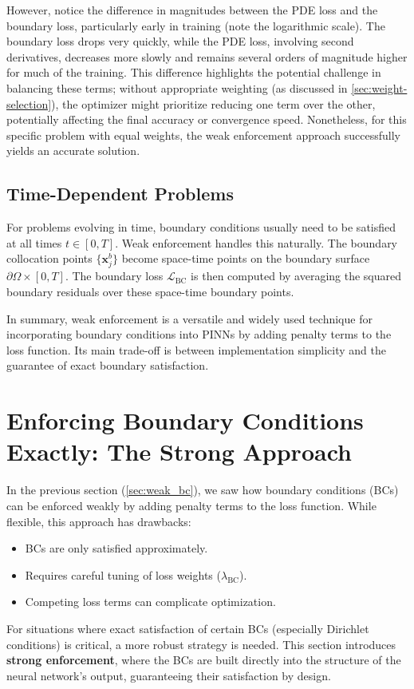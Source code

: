 However, notice the difference in magnitudes between the PDE loss and the boundary loss, particularly early in training (note the logarithmic scale). The boundary loss drops very quickly, while the PDE loss, involving second derivatives, decreases more slowly and remains several orders of magnitude higher for much of the training. This difference highlights the potential challenge in balancing these terms; without appropriate weighting (as discussed in \cref{sec:weight-selection}), the optimizer might prioritize reducing one term over the other, potentially affecting the final accuracy or convergence speed. Nonetheless, for this specific problem with equal weights, the weak enforcement approach successfully yields an accurate solution.



\subsection{Time-Dependent Problems}

For problems evolving in time, boundary conditions usually need to be satisfied at all times $t \in [0, T]$. Weak enforcement handles this naturally. The boundary collocation points $\{\mathbf{x}_j^b\}$ become space-time points on the boundary surface $\partial\Omega \times [0, T]$. The boundary loss $\mathcal{L}_{\text{BC}}$ is then computed by averaging the squared boundary residuals over these space-time boundary points.

In summary, weak enforcement is a versatile and widely used technique for incorporating boundary conditions into PINNs by adding penalty terms to the loss function. Its main trade-off is between implementation simplicity and the guarantee of exact boundary satisfaction.

\section{Enforcing Boundary Conditions Exactly: The Strong Approach}
\label{sec:strong_bc} %

In the previous section (\cref{sec:weak_bc}), we saw how boundary conditions (BCs) can be enforced weakly by adding penalty terms to the loss function. While flexible, this approach has drawbacks:
\begin{itemize}
    \item BCs are only satisfied approximately.
    \item Requires careful tuning of loss weights ($\lambda_{\text{BC}}$).
    \item Competing loss terms can complicate optimization.
\end{itemize}
For situations where exact satisfaction of certain BCs (especially Dirichlet conditions) is critical, a more robust strategy is needed. This section introduces \textbf{strong enforcement}, where the BCs are built directly into the structure of the neural network's output, guaranteeing their satisfaction by design.

